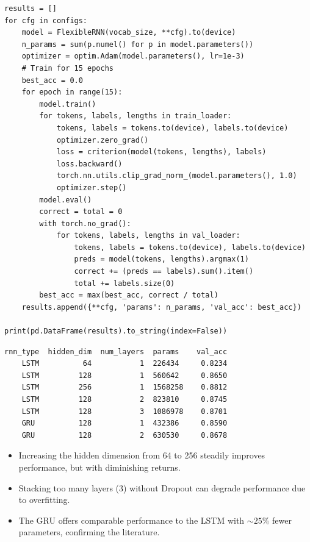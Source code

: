 \begin{codeblock}[title=\textbf{Ablation: hidden size, layers, LSTM vs GRU}]
\begin{verbatim}
results = []
for cfg in configs:
    model = FlexibleRNN(vocab_size, **cfg).to(device)
    n_params = sum(p.numel() for p in model.parameters())
    optimizer = optim.Adam(model.parameters(), lr=1e-3)
    # Train for 15 epochs
    best_acc = 0.0
    for epoch in range(15):
        model.train()
        for tokens, labels, lengths in train_loader:
            tokens, labels = tokens.to(device), labels.to(device)
            optimizer.zero_grad()
            loss = criterion(model(tokens, lengths), labels)
            loss.backward()
            torch.nn.utils.clip_grad_norm_(model.parameters(), 1.0)
            optimizer.step()
        model.eval()
        correct = total = 0
        with torch.no_grad():
            for tokens, labels, lengths in val_loader:
                tokens, labels = tokens.to(device), labels.to(device)
                preds = model(tokens, lengths).argmax(1)
                correct += (preds == labels).sum().item()
                total += labels.size(0)
        best_acc = max(best_acc, correct / total)
    results.append({**cfg, 'params': n_params, 'val_acc': best_acc})

print(pd.DataFrame(results).to_string(index=False))
\end{verbatim}
\end{codeblock}

\begin{codeoutput}
\begin{verbatim}
rnn_type  hidden_dim  num_layers  params    val_acc
    LSTM          64           1  226434     0.8234
    LSTM         128           1  560642     0.8650
    LSTM         256           1  1568258    0.8812
    LSTM         128           2  823810     0.8745
    LSTM         128           3  1086978    0.8701
    GRU          128           1  432386     0.8590
    GRU          128           2  630530     0.8678
\end{verbatim}
\end{codeoutput}

\begin{remark}[Observations]
\begin{itemize}
  \item Increasing the hidden dimension from 64 to 256 steadily improves
    performance, but with diminishing returns.
  \item Stacking too many layers (3) without Dropout can degrade
    performance due to overfitting.
  \item The GRU offers comparable performance to the LSTM with $\sim 25\%$
    fewer parameters, confirming the literature.
\end{itemize}
\end{remark}

